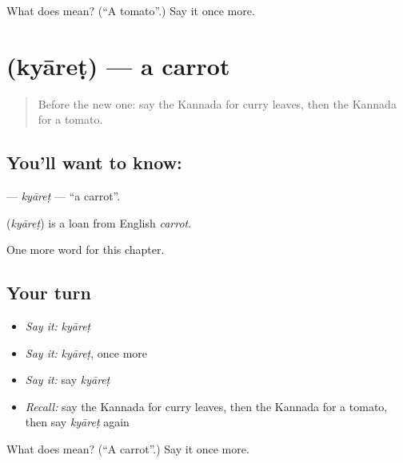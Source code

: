 \begin{tcolorbox}[breakable,colback=teal!4,colframe=teal!35!black,title={Before you move on}]
What does  mean? (\textquotedblleft{}A tomato\textquotedblright{}.) Say it once more.
\end{tcolorbox}
\section[\texorpdfstring{\kn{ಕ್ಯಾರೆಟ್} (kyāreṭ)}{ಕ್ಯಾರೆಟ್ (kyāreṭ)}]{ (kyāreṭ) — a carrot}

\label{lesson:KA-C293-kyaret}



\begin{quote}
Before the new one: say the Kannada for curry leaves, then the Kannada for a tomato.
\end{quote}

\subsection*{You'll want to know: }
\textbf{} — \emph{kyāreṭ} — \textquotedblleft{}a carrot\textquotedblright{}.

\begin{cousinweb}
\textbf{} (\emph{kyāreṭ}) is a loan from English \emph{carrot}.
\end{cousinweb}

\begin{grammarlens}[title={What you've built}]
One more word for this chapter.
\end{grammarlens}

\subsection*{Your turn}
\begin{itemize}
\raggedright
  \item \emph{Say it:} \emph{kyāreṭ}
  \item \emph{Say it:} \emph{kyāreṭ}, once more
  \item \emph{Say it:} say \emph{kyāreṭ}
  \item \emph{Recall:} say the Kannada for curry leaves, then the Kannada for a tomato, then say \emph{kyāreṭ} again
\end{itemize}

\begin{tcolorbox}[breakable,colback=teal!4,colframe=teal!35!black,title={Before you move on}]
What does  mean? (\textquotedblleft{}A carrot\textquotedblright{}.) Say it once more.
\end{tcolorbox}
